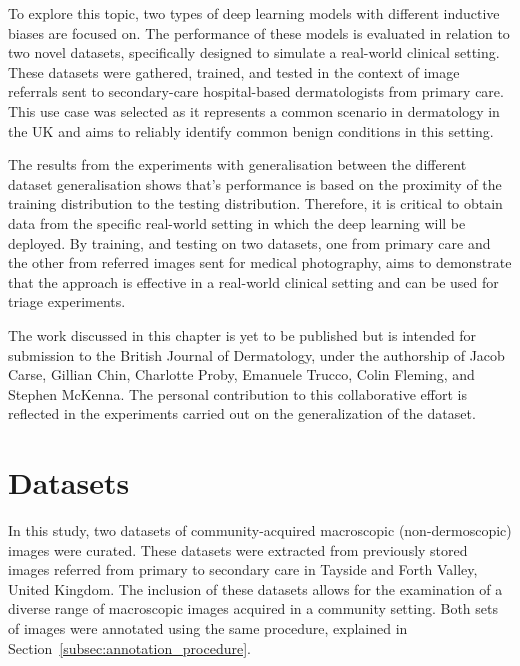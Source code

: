 To explore this topic, two types of deep learning models with different inductive biases are focused on. The performance of these models is evaluated in relation to two novel datasets, specifically designed to simulate a real-world clinical setting. These datasets were gathered, trained, and tested in the context of image referrals sent to secondary-care hospital-based dermatologists from primary care. This use case was selected as it represents a common scenario in dermatology in the UK and aims to reliably identify common benign conditions in this setting.

The results from the experiments with generalisation between the different dataset generalisation shows that’s performance is based on the proximity of the training distribution to the testing distribution. Therefore, it is critical to obtain data from the specific real-world setting in which the deep learning will be deployed. By training, and testing on two datasets, one from primary care and the other from referred images sent for medical photography, aims to demonstrate that the approach is effective in a real-world clinical setting and can be used for triage experiments.

The work discussed in this chapter is yet to be published but is intended for submission to the British Journal of Dermatology, under the authorship of Jacob Carse, Gillian Chin, Charlotte Proby, Emanuele Trucco, Colin Fleming, and Stephen McKenna. The personal contribution to this collaborative effort is reflected in the experiments carried out on the generalization of the dataset.



\section{Datasets}
\label{sec:generalisation_datasets}
In this study, two datasets of community-acquired macroscopic (non-dermoscopic) images were curated. These datasets were extracted from previously stored images referred from primary to secondary care in Tayside and Forth Valley, United Kingdom. The inclusion of these datasets allows for the examination of a diverse range of macroscopic images acquired in a community setting. Both sets of images were annotated using the same procedure, explained in Section~\ref{subsec:annotation_procedure}.

